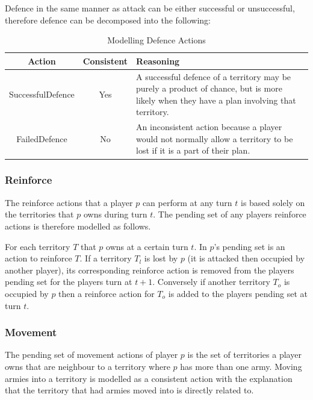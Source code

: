 \documentclass[parskip]{cs4rep}
\begin{document}
Defence in the same manner as attack can be either successful or unsuccessful, therefore defence can be decomposed into the following: 

\begin{table}[ht]
\centering
\begin{tabular}{|c|c|p{8cm}|}
\hline 
\textbf{Action} & \textbf{Consistent}  & \textbf{Reasoning} \\ 
\hline 
SuccessfulDefence & Yes & A successful defence of a territory may be purely a product of chance, but is more likely when they have a plan involving that territory. \\ 
\hline 
FailedDefence & No & An inconsistent action because a player would not normally allow a territory to be lost if it is a part of their plan. \\ 
\hline
\end{tabular}
\caption{Modelling Defence Actions}
\label{table:attack-defend-modelling}
\end{table}

\newpage

\subsubsection{Reinforce}

The reinforce actions that a player $p$ can perform at any turn $t$ is based solely on the territories that $p$ owns during turn $t$. The pending set of any players reinforce actions is therefore modelled as follows. 

For each territory $T$ that $p$ owns at a certain turn $t$. In $p$'s pending set is an action to reinforce $T$. If a territory $T_{l}$ is lost by $p$ (it is attacked then occupied by another player), its corresponding reinforce action is removed from the players pending set for the players turn at $t+1$. Conversely if another territory $T_{o}$ is occupied by $p$ then a reinforce action for $T_{o}$ is added to the players pending set at turn $t$.

\subsubsection{Movement}

The pending set of movement actions of player $p$ is the set of territories a player owns that are neighbour to a territory where $p$ has more than one army. Moving armies into a territory is modelled as a consistent action with the explanation that the territory that had armies moved into is directly related to.
\end{document}
